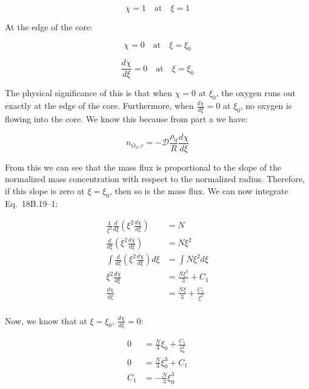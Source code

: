 \documentclass[letterpaper,12pt]{article}
\begin{document}
\begin{equation}
\boxed{
    \chi = 1 \quad \mathrm{at} \quad \xi = 1
}
\end{equation}

At the edge of the core:

\begin{equation}
\boxed{
    \chi = 0 \quad \mathrm{at} \quad \xi = \xi_0
}
\end{equation}

\begin{equation}
\boxed{
    \frac{d \chi}{d \xi} = 0 \quad \mathrm{at} \quad \xi = \xi_0
}
\end{equation}

The physical significance of this is that when $\chi = 0$ at $\xi_0$, the oxygen runs out exactly at the edge of the core. Furthermore, when $\frac{d \chi}{d \xi} = 0$ at $\xi_0$, no oxygen is flowing into the core. We know this because from part a we have:

\begin{equation}
    n_{O_{2}, r} = - \mathcal{D} \frac{\rho_0}{R}\frac{d \chi}{d \xi}
\end{equation}

From this we can see that the mass flux is proportional to the slope of the normalized mass concentration with respect to the normalized radius. Therefore, if this slope is zero at $\xi = \xi_0$, then so is the mass flux. We can now integrate Eq.~18B.19--1:

\begin{equation}
\begin{aligned}
    \frac{1}{\xi^2} \frac{d}{d\xi} \left( \xi^2 \frac{d\chi}{d\xi} \right) &= N \\
    \frac{d}{d\xi} \left( \xi^2 \frac{d\chi}{d\xi} \right) &= N\xi^2 \\
    \int \frac{d}{d\xi} \left( \xi^2 \frac{d\chi}{d\xi} \right) d \xi &=  \int N\xi^2 d \xi\\
    \xi^2 \frac{d\chi}{d\xi} &= \frac{N\xi^3}{3} + C_1 \\
    \frac{d\chi}{d\xi} &= \frac{N\xi}{3} + \frac{C_1}{\xi^2} \\
\end{aligned}
\end{equation}

Now, we know that at $\xi = \xi_0$, $\frac{d \chi}{d \xi} = 0$:

\begin{equation}
\begin{aligned}
    0   &= \frac{N}{3} \xi_0 + \frac{C_1}{\xi^2_0} \\
    0   &= \frac{N}{3} \xi^3_0 + C_1 \\
    C_1 &= - \frac{N}{3} \xi^3_0
\end{aligned}
\end{equation}
\end{document}
